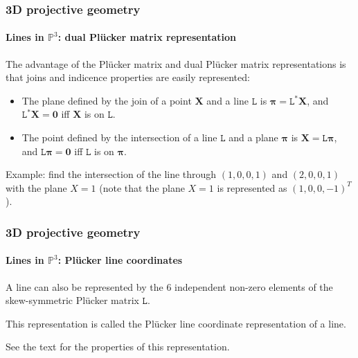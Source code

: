 \documentclass[aspectratio=169]{beamer}
\renewcommand{\vec}[1]{\boldsymbol{#1}}
\newcommand{\mat}[1]{\mathtt{#1}}
\def\Pset{\mathbb{P}}
\begin{document}
\begin{frame}
\frametitle{3D projective geometry}
\framesubtitle{Lines in $\Pset^3$: dual Pl\"ucker matrix representation}

The advantage of the Pl\"ucker matrix and dual Pl\"ucker matrix
representations is that \alert{joins} and \alert{indicence} properties
are easily represented:
\begin{itemize}
\item The \alert{plane} defined by the \alert{join of a point}
  $\vec{X}$ and \alert{a line} $\mat{L}$ is
  $\vec{\pi}=\mat{L}^*\vec{X}$, and $\mat{L}^*\vec{X}=\vec{0}$ iff
  $\vec{X}$ is on $\mat{L}$.
\item The \alert{point} defined by the \alert{intersection of a line}
  $\mat{L}$ and \alert{a plane} $\vec{\pi}$ is $\vec{X} =
  \mat{L}\vec{\pi}$, and $\mat{L}\vec{\pi} = \vec{0}$ iff $\mat{L}$ is
  on $\vec{\pi}$.
\end{itemize}

\medskip

Example: find the intersection of the line through $(1,0,0,1)$ and
$(2,0,0,1)$ with the plane $X=1$
(note that the plane $X=1$ is represented as $(1,0,0,-1)^T$).

\end{frame}

\begin{frame}
\frametitle{3D projective geometry}
\framesubtitle{Lines in $\Pset^3$: Pl\"ucker line coordinates}

A line can also be represented by the \alert{6 independent non-zero
elements of the skew-symmetric Pl\"ucker matrix} $\mat{L}$.

\medskip

This representation is called the \alert{Pl\"ucker line coordinate
  representation} of a line.

\medskip

See the text for the properties of this representation.

\end{frame}
\end{document}
